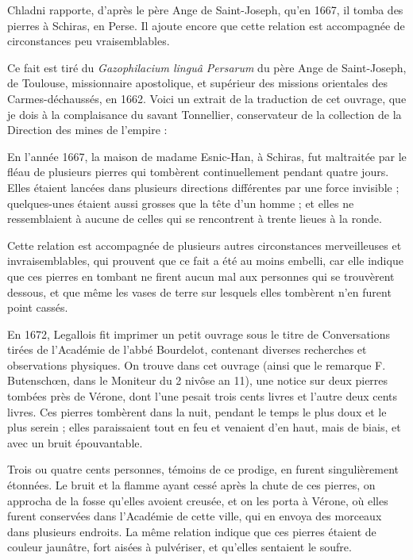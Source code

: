 \documentclass[a4paper, 12pt, oneside, french]{article}
\begin{document}
Chladni rapporte, d'après le père Ange de Saint-Joseph, qu'en 1667, il tomba des pierres à Schiras, en Perse. Il ajoute encore que cette relation est accompagnée de circonstances peu vraisemblables.

Ce fait est tiré du \emph{Gazophilacium linguâ Persarum} du père Ange de Saint-Joseph, de Toulouse, missionnaire apostolique, et supérieur des missions orientales des Carmes-déchaussés, en 1662. Voici un extrait de la traduction de cet ouvrage, que je dois à la complaisance du savant Tonnellier, conservateur de la collection de la Direction des mines de l'empire :

\og En l'année 1667, la maison de madame Esnic-Han, à Schiras, fut maltraitée par le fléau de plusieurs pierres qui tombèrent continuellement pendant quatre jours. Elles étaient lancées dans plusieurs directions différentes par une force invisible ; quelques-unes étaient aussi grosses que la tête d'un homme ; et elles ne ressemblaient à aucune de celles qui se rencontrent à trente lieues à la ronde. \fg

Cette relation est accompagnée de plusieurs autres circonstances merveilleuses et invraisemblables, qui prouvent que ce fait a été au moins embelli, car elle indique que ces pierres en tombant ne firent aucun mal aux personnes qui se trouvèrent dessous, et que même les vases de terre sur lesquels elles tombèrent n'en furent point cassés.

En 1672, Legallois fit imprimer un petit ouvrage sous le titre de Conversations tirées de l'Académie de l'abbé Bourdelot, contenant diverses recherches et observations physiques. On trouve dans cet ouvrage (ainsi que le remarque F. Butenschœn, dans le Moniteur du 2 nivôse an 11), une notice sur deux pierres tombées près de Vérone, dont l'une pesait trois cents livres et l'autre deux cents livres. Ces pierres tombèrent dans la nuit, pendant le temps le plus doux et le plus serein ; elles paraissaient tout en feu et venaient d'en haut, mais de biais, et avec un bruit épouvantable.

Trois ou quatre cents personnes, témoins de ce prodige, en furent singulièrement étonnées. Le bruit et la flamme ayant cessé après la chute de ces pierres, on approcha de la fosse qu'elles avoient creusée, et on les porta à Vérone, où elles furent conservées dans l'Académie de cette ville, qui en envoya des morceaux dans plusieurs endroits. La même relation indique que ces pierres étaient de couleur jaunâtre, fort aisées à pulvériser, et qu'elles sentaient le soufre.
\end{document}
